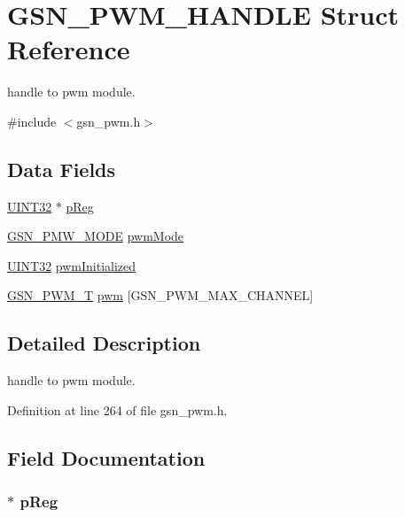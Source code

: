 \hypertarget{a00182}{
\section{GSN\_\-PWM\_\-HANDLE Struct Reference}
\label{a00182}
}


handle to pwm module.  




{\ttfamily \#include $<$gsn\_\-pwm.h$>$}

\subsection*{Data Fields}
\begin{DoxyCompactItemize}
\item 
\hyperlink{a00660_gae1e6edbbc26d6fbc71a90190d0266018}{UINT32} $\ast$ \hyperlink{a00182_a8843236297383a79c5da2bbddfcee223}{pReg}
\item 
\hyperlink{a00650_ga2ce321cf068e815e8a30642d73f1bdd4}{GSN\_\-PMW\_\-MODE} \hyperlink{a00182_a8f5b60bc2e72b9a19cf8f4a991ac4327}{pwmMode}
\item 
\hyperlink{a00660_gae1e6edbbc26d6fbc71a90190d0266018}{UINT32} \hyperlink{a00182_a8b5041b6996ce36cbca91c0a16985da0}{pwmInitialized}
\item 
\hyperlink{a00180}{GSN\_\-PWM\_\-T} \hyperlink{a00182_affa137db63d2e4919928e2d76ade5f71}{pwm} \mbox{[}GSN\_\-PWM\_\-MAX\_\-CHANNEL\mbox{]}
\end{DoxyCompactItemize}


\subsection{Detailed Description}
handle to pwm module. 

Definition at line 264 of file gsn\_\-pwm.h.



\subsection{Field Documentation}
\hypertarget{a00182_a8843236297383a79c5da2bbddfcee223}{
\subsubsection[{pReg}]{$\ast$ {\bf pReg}}}
\label{a00182_a8843236297383a79c5da2bbddfcee223}


